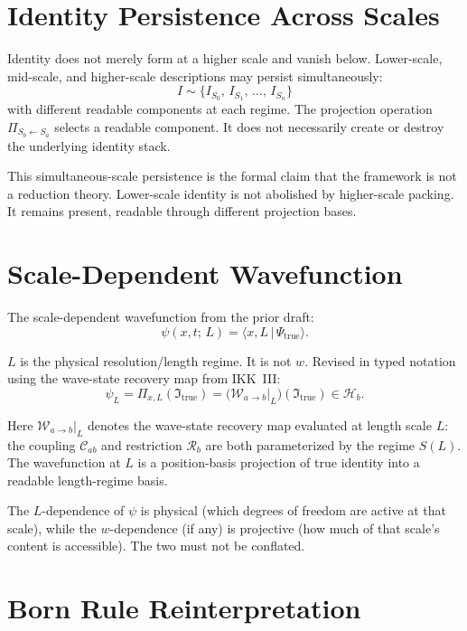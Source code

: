 \documentclass[11pt,a4paper,oneside]{article}
\newcommand{\Itrue}{\mathfrak{I}_{\mathrm{true}}}   %
\newcommand{\Hb}{\mathcal{H}_b}               %
\newcommand{\wcoord}{w}
\newcommand{\PiS}[2]{\Pi_{S_{#2}\leftarrow S_{#1}}}  %
\newcommand{\Wab}{\mathcal{W}_{a\to b}}        %
\newcommand{\Cab}{\mathcal{C}_{ab}}            %
\newcommand{\Rab}{\mathcal{R}_b}               %
\begin{document}
\section{Identity Persistence Across Scales}

Identity does not merely form at a higher scale and vanish below. Lower-scale, mid-scale, and higher-scale descriptions may persist simultaneously:
\[
I \sim \{I_{S_0},\, I_{S_1},\, \ldots,\, I_{S_n}\}
\]
with different readable components at each regime. The projection operation $\PiS{a}{b}$ selects a readable component. It does not necessarily create or destroy the underlying identity stack.

This simultaneous-scale persistence is the formal claim that the framework is not a reduction theory. Lower-scale identity is not abolished by higher-scale packing. It remains present, readable through different projection bases.

\section{Scale-Dependent Wavefunction}

The scale-dependent wavefunction from the prior draft:
\[
\psi(x,t;\, L) = \langle x, L\,|\, \Psi_{\mathrm{true}}\rangle.
\]

$L$ is the physical resolution/length regime. It is not $\wcoord$. Revised in typed notation using the wave-state recovery map from IKK~III:
\[
\boxed{\psi_L = \Pi_{x,L}(\Itrue) = \big(\Wab\big|_{L}\big)(\Itrue) \in \Hb.}
\]

Here $\Wab|_L$ denotes the wave-state recovery map evaluated at length scale $L$: the coupling $\Cab$ and restriction $\Rab$ are both parameterized by the regime $S(L)$. The wavefunction at $L$ is a position-basis projection of true identity into a readable length-regime basis.

The $L$-dependence of $\psi$ is physical (which degrees of freedom are active at that scale), while the $\wcoord$-dependence (if any) is projective (how much of that scale's content is accessible). The two must not be conflated.

\section{Born Rule Reinterpretation}
\end{document}
